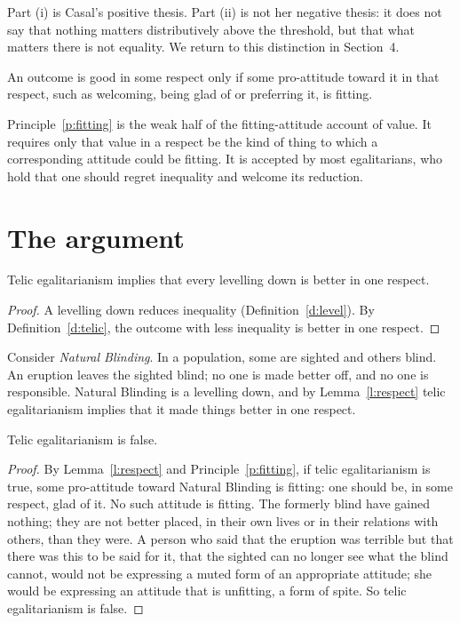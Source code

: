 \documentclass{situationist-preprint}
\begin{document}
Part (i) is Casal's positive thesis. Part (ii) is not her negative thesis: it does not say that nothing matters distributively above the threshold, but that what matters there is not equality. We return to this distinction in Section~4.

\begin{principle}\label{p:fitting}
An outcome is good in some respect only if some pro-attitude toward it in that respect, such as welcoming, being glad of or preferring it, is fitting.
\end{principle}

Principle~\ref{p:fitting} is the weak half of the fitting-attitude account of value. It requires only that value in a respect be the kind of thing to which a corresponding attitude could be fitting. It is accepted by most egalitarians, who hold that one should regret inequality and welcome its reduction.

\section{The argument}

\begin{lemma}\label{l:respect}
Telic egalitarianism implies that every levelling down is better in one respect.
\end{lemma}

\begin{proof}
A levelling down reduces inequality (Definition~\ref{d:level}). By Definition~\ref{d:telic}, the outcome with less inequality is better in one respect.
\end{proof}

Consider \emph{Natural Blinding}. In a population, some are sighted and others blind. An eruption leaves the sighted blind; no one is made better off, and no one is responsible. Natural Blinding is a levelling down, and by Lemma~\ref{l:respect} telic egalitarianism implies that it made things better in one respect.

\begin{theorem}\label{t:levelling}
Telic egalitarianism is false.
\end{theorem}

\begin{proof}
By Lemma~\ref{l:respect} and Principle~\ref{p:fitting}, if telic egalitarianism is true, some pro-attitude toward Natural Blinding is fitting: one should be, in some respect, glad of it. No such attitude is fitting. The formerly blind have gained nothing; they are not better placed, in their own lives or in their relations with others, than they were. A person who said that the eruption was terrible but that there was this to be said for it, that the sighted can no longer see what the blind cannot, would not be expressing a muted form of an appropriate attitude; she would be expressing an attitude that is unfitting, a form of spite. So telic egalitarianism is false.
\end{proof}
\end{document}
